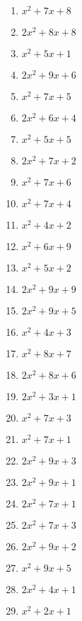 \documentclass[9pt,dvipdfmx,a4paper]{article}
\begin{document}
\begin{multicols}{2}
\begin{enumerate}
\item
$ x^{2} + 7 x + 8$

\item
$ 2 x^{2} + 8 x + 8$

\item
$ x^{2} + 5 x + 1$

\item
$ 2 x^{2} + 9 x + 6$

\item
$ x^{2} + 7 x + 5$

\item
$ 2 x^{2} + 6 x + 4$

\item
$ x^{2} + 5 x + 5$

\item
$ 2 x^{2} + 7 x + 2$

\item
$ x^{2} + 7 x + 6$

\item
$ x^{2} + 7 x + 4$

\item
$ x^{2} + 4 x + 2$

\item
$ x^{2} + 6 x + 9$

\item
$ x^{2} + 5 x + 2$

\item
$ 2 x^{2} + 9 x + 9$

\item
$ 2 x^{2} + 9 x + 5$

\item
$ x^{2} + 4 x + 3$

\item
$ x^{2} + 8 x + 7$

\item
$ 2 x^{2} + 8 x + 6$

\item
$ 2 x^{2} + 3 x + 1$

\item
$ x^{2} + 7 x + 3$

\item
$ x^{2} + 7 x + 1$

\item
$ 2 x^{2} + 9 x + 3$

\item
$ 2 x^{2} + 9 x + 1$

\item
$ 2 x^{2} + 7 x + 1$

\item
$ 2 x^{2} + 7 x + 3$

\item
$ 2 x^{2} + 9 x + 2$

\item
$ x^{2} + 9 x + 5$

\item
$ 2 x^{2} + 4 x + 1$

\item
$ x^{2} + 2 x + 1$


\end{enumerate}
\end{multicols}
\end{document}

